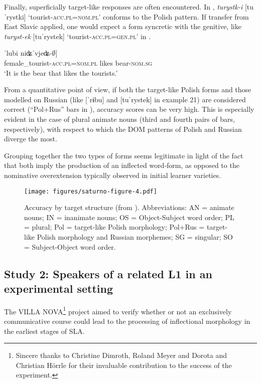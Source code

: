 \documentclass[output=paper,            colorlinks, citecolor=brown            		  ]{langscibook}
\begin{document}
\begin{sloppypar}
Finally, superficially target-like responses are often encountered. In , \textit{tu\-rystk-i} [tuˈrystki] ‘tourist-\textsc{acc.pl}=\textsc{nom.pl’} conforms to the Polish pattern. If transfer from East Slavic applied, one would expect a form syncretic with the genitive, like \textit{turyst-ek} [tuˈrystek] ‘tourist-\textsc{acc.pl}=\textsc{gen.pl}’ in .
\end{sloppypar}

\ea\label{ex:saturno:22}  
\gll {[tuˈristk-i}         ˈlubi  {niʥˈvjeʥ-${\emptyset}$]}\\
  female\_tourist-\textsc{acc.pl=nom.pl}  likes  bear-\textsc{nom.sg}\\ 
\glt ‘It is the bear that likes the tourists.’
\z

From a quantitative point of view, if both the target-like Polish forms and those modelled on Russian (like [ˈrɨbu] and [tuˈrystek] in example 21) are considered correct (“Pol+Rus” bars in ), accuracy scores can be very high. This is especially evident in the case of plural animate nouns (third and fourth pairs of bars, respectively), with respect to which the DOM patterns of Polish and Russian diverge the most.

Grouping together the two types of forms seems legitimate in light of the fact that both imply the production of an inflected word-form, as opposed to the nominative overextension typically observed in initial learner varieties.

\vfill
\begin{figure}[H]
\texttt{[image: figures/saturno-figure-4.pdf]}
\caption{Accuracy by target structure (from \citealt[10]{Saturno2020b}). Abbreviations: AN = animate nouns; IN = inanimate nouns; OS = Object-Subject word order; PL = plural; Pol = target-like Polish morphology; Pol+Rus = target-like Polish morphology and Russian morphemes; SG = singular; SO = Subject-Object word order.}
\label{fig:saturno:4}
\end{figure}
\vfill\pagebreak


\subsection{Study 2: Speakers of a related L1 in an experimental setting \citep{Saturno2022a}}
\label{sec:saturno:3.3}
The VILLA NOVA\footnote{{Sincere thanks to Christine Dimroth, Roland Meyer and Dorota and Christian Hörrle for their invaluable contribution to the success of the experiment.}} project aimed to verify whether or not an exclusively communicative course could lead to the processing of inflectional morphology in the earliest stages of SLA.
\end{document}
